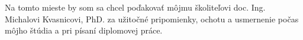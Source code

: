 Na tomto mieste by som sa chcel poďakovať môjmu školiteľovi doc. Ing. Michalovi Kvasnicovi, PhD. za užitočné pripomienky, ochotu a usmernenie počas môjho štúdia a pri písaní diplomovej práce.